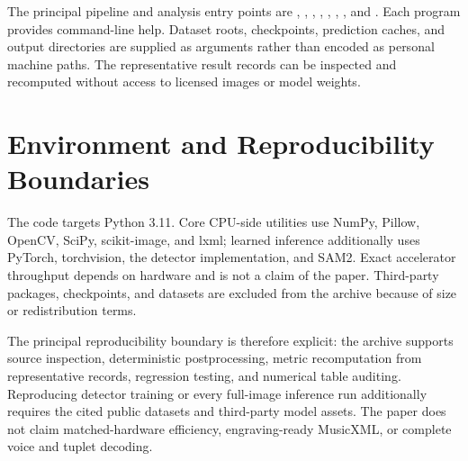 \documentclass[letterpaper]{article}
\begin{document}
The principal pipeline and analysis entry points are , , , , , , , and .
Each program provides command-line help. Dataset roots, checkpoints, prediction caches, and output directories are supplied as arguments rather than encoded as personal machine paths. The representative result records can be inspected and recomputed without access to licensed images or model weights.

\section{Environment and Reproducibility Boundaries}
The code targets Python 3.11. Core CPU-side utilities use NumPy, Pillow, OpenCV, SciPy, scikit-image, and lxml; learned inference additionally uses PyTorch, torchvision, the detector implementation, and SAM2. Exact accelerator throughput depends on hardware and is not a claim of the paper. Third-party packages, checkpoints, and datasets are excluded from the archive because of size or redistribution terms.

The principal reproducibility boundary is therefore explicit: the archive supports source inspection, deterministic postprocessing, metric recomputation from representative records, regression testing, and numerical table auditing. Reproducing detector training or every full-image inference run additionally requires the cited public datasets and third-party model assets. The paper does not claim matched-hardware efficiency, engraving-ready MusicXML, or complete voice and tuplet decoding.
\end{document}
